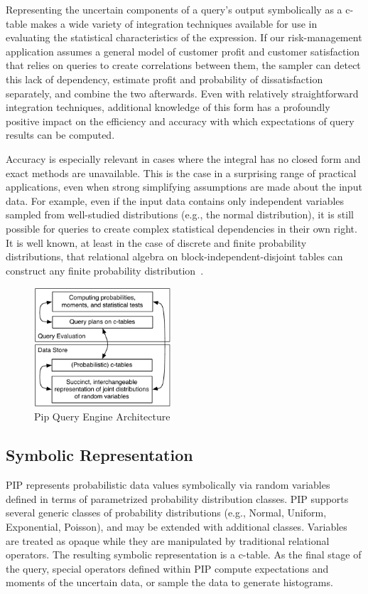 
Representing the uncertain components of a query's output symbolically as a c-table makes a wide variety of integration techniques available for use in evaluating the statistical characteristics of the expression.  If our risk-management application assumes a general model of customer profit and customer satisfaction that relies on queries to create correlations between them, the sampler can detect this lack of dependency, estimate profit and probability of dissatisfaction separately, and combine the two afterwards.  Even with relatively straightforward integration techniques, additional knowledge of this form has a profoundly positive impact on the efficiency and accuracy with which expectations of query results can be computed.

Accuracy is especially relevant in cases where the integral has no closed form and exact methods are unavailable.  This is the case in a surprising range of practical applications, even when strong simplifying assumptions are made about the input data.  For example, even if the input data contains only independent variables sampled from well-studied distributions (e.g., the normal distribution), it is still possible for queries to create complex statistical dependencies in their own right.  It is well known, at least in the case of discrete and finite probability distributions, that relational algebra on block-independent-disjoint tables can construct any finite probability distribution\ \cite{1325861,IL1984}.

\begin{figure}
\begin{center}
\includegraphics[width=2in]{graphics/arch.pdf}
\vspace*{-0.1in}
\caption{Pip Query Engine Architecture}
\label{fig:arch}
\end{center}
\vspace*{-0.35in}
\end{figure}

\subsection{Symbolic Representation}
PIP represents probabilistic data values symbolically via random variables defined in terms of parametrized probability distribution classes.  PIP supports several generic classes of probability distributions (e.g., Normal, Uniform, Exponential, Poisson), and may be extended with additional classes.  Variables are treated as opaque while they are manipulated by traditional relational operators.  The resulting symbolic representation is a c-table.  As the final stage of the query, special operators defined within PIP compute expectations and moments of the uncertain data, or sample the data to generate histograms.  

